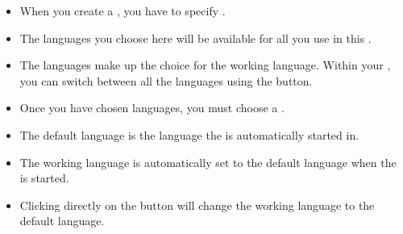 
\label{projlangs}
\begin{itemize}
\item When you create a \gdproject{}, you have to specify .
\item The languages you choose here will be available for all \gdauts{} you use in this \gdproject{}. 
\item The \gdproject{} languages make up the choice for the working language. Within your \gdproject{}, you can switch between all the \gdproject{} languages using the  button. 
\item Once you have chosen \gdproject{} languages, you must choose a .
\item The default language is the language the \gdproject{} is automatically started in. 
\item The working language  is automatically set to the default \gdproject{} language when the \ite{}  is started. 
\item Clicking directly on the  button will change the working language to the default language.
\end{itemize}
